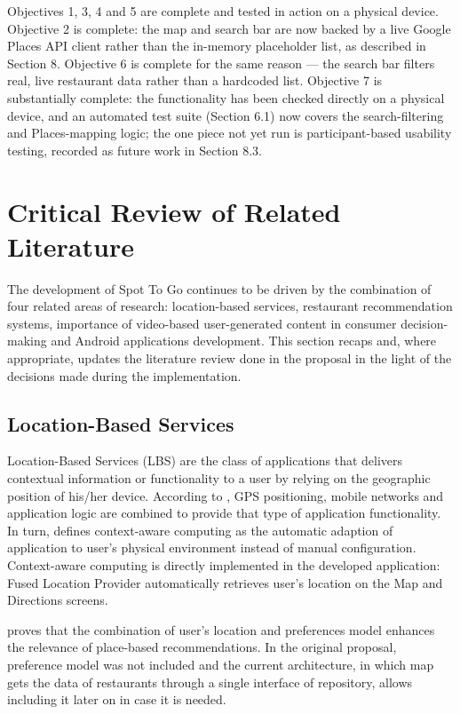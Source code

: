 \documentclass[12pt, a4paper]{article}
\begin{document}
Objectives 1, 3, 4 and 5 are complete and tested in action on a physical device. Objective 2 is complete: the map and search bar are now backed by a live Google Places API client rather than the in-memory placeholder list, as described in Section 8. Objective 6 is complete for the same reason --- the search bar filters real, live restaurant data rather than a hardcoded list. Objective 7 is substantially complete: the functionality has been checked directly on a physical device, and an automated test suite (Section 6.1) now covers the search-filtering and Places-mapping logic; the one piece not yet run is participant-based usability testing, recorded as future work in Section 8.3.

\section{Critical Review of Related Literature}

The development of Spot To Go continues to be driven by the combination of four related areas of research: location-based services, restaurant recommendation systems, importance of video-based user-generated content in consumer decision-making and Android applications development. This section recaps and, where appropriate, updates the literature review done in the proposal in the light of the decisions made during the implementation.

\subsection{Location-Based Services}

Location-Based Services (LBS) are the class of applications that delivers contextual information or functionality to a user by relying on the geographic position of his/her device. According to \citet{schiller2004}, GPS positioning, mobile networks and application logic are combined to provide that type of application functionality. In turn, \citet{dey2001} defines context-aware computing as the automatic adaption of application to user's physical environment instead of manual configuration. Context-aware computing is directly implemented in the developed application: Fused Location Provider automatically retrieves user's location on the Map and Directions screens.

\citet{bao2012} proves that the combination of user's location and preferences model enhances the relevance of place-based recommendations. In the original proposal, preference model was not included and the current architecture, in which map gets the data of restaurants through a single interface of repository, allows including it later on in case it is needed.
\end{document}
